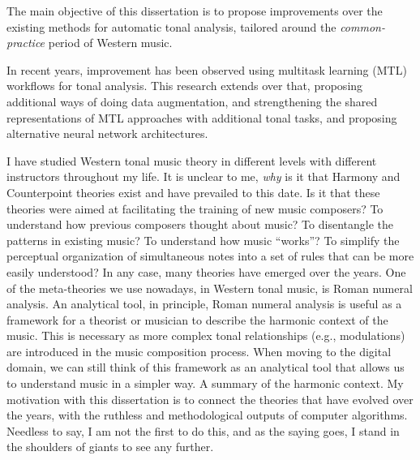 The main objective of this dissertation is to propose
improvements over the existing methods for automatic tonal
analysis, tailored around the \emph{common-practice} period
of Western music.

In recent years, improvement has been observed using
multitask learning (MTL) workflows for tonal analysis. This
research extends over that, proposing additional ways of
doing data augmentation, and strengthening the shared
representations of MTL approaches with additional tonal
tasks, and proposing alternative neural network
architectures.


I have studied Western tonal music theory in different
levels with different instructors throughout my life. It is
unclear to me, \emph{why} is it that Harmony and
Counterpoint theories exist and have prevailed to this date.
Is it that these theories were aimed at facilitating the
training of new music composers? To understand how previous
composers thought about music? To disentangle the patterns
in existing music? To understand how music ``works''? To
simplify the perceptual organization of simultaneous notes
into a set of rules that can be more easily understood? In
any case, many theories have emerged over the years. One of
the meta-theories we use nowadays, in Western tonal music,
is Roman numeral analysis. An analytical tool, in principle,
Roman numeral analysis is useful as a framework for a
theorist or musician to describe the harmonic context of the
music. This is necessary as more complex tonal relationships
(e.g., modulations) are introduced in the music composition
process. When moving to the digital domain, we can still
think of this framework as an analytical tool that allows us
to understand music in a simpler way. A summary of the
harmonic context. My motivation with this dissertation is to
connect the theories that have evolved over the years, with
the ruthless and methodological outputs of computer
algorithms. Needless to say, I am not the first to do this,
and as the saying goes, I stand in the shoulders of giants
to see any further.

